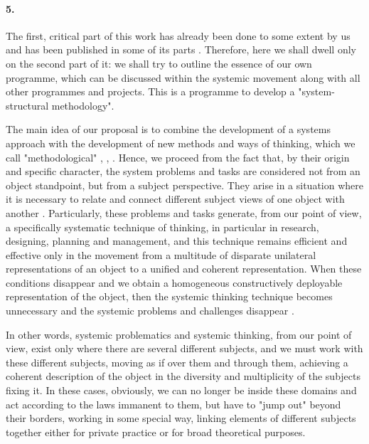 \documentclass[11pt,a4paper]{article}
\begin{document}
\paragraph{5.}
The first, critical part of this work has already been done to some extent by
us and has been published in some of its parts \cite{Shchedrovitsky1964a,
  Shchedrovitsky1974b, Shchedrovitsky1976, Development1975}. Therefore, here
we shall dwell only on the second part of it: we shall try to outline the
essence of our own programme, which can be discussed within the systemic
movement along with all other programmes and projects. This is a programme to
develop a "system-structural methodology".

The main idea of our proposal is to combine the development of a systems
approach with the development of new methods and ways of thinking, which we
call "methodological" \cite{Shchedrovitsky1964a},
\cite[pp. 50-84]{Shchedrovitsky1969b}, \cite{Development1975}. Hence, we
proceed from the fact that, by their origin and specific character, the system
problems and tasks are considered not from an object standpoint, but from a
subject perspective. They arise in a situation where it is necessary to relate
and connect different subject views of one object with another
\cite{Shchedrovitsky1964a, Shchedrovitsky1964h, Shchedrovitsky1971i}.
Particularly, these problems and tasks generate, from our point of view, a
specifically systematic technique of thinking, in particular in research,
designing, planning and management, and this technique remains efficient and
effective only in the movement from a multitude of disparate unilateral
representations of an object to a unified and coherent representation. When
these conditions disappear and we obtain a homogeneous constructively
deployable representation of the object, then the systemic thinking technique
becomes unnecessary and the systemic problems and challenges disappear
\cite{Shchedrovitsky1974b}.

In other words, systemic problematics and systemic thinking, from our point of
view, exist only where there are several different subjects, and we must work
with these different subjects, moving as if over them and through them,
achieving a coherent description of the object in the diversity and
multiplicity of the subjects fixing it. In these cases, obviously, we can no
longer be inside these domains and act according to the laws immanent to them,
but have to "jump out" beyond their borders, working in some special way,
linking elements of different subjects together either for private practice or
for broad theoretical purposes.
\end{document}
